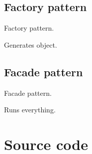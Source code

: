 \documentclass[letterpaper,10pt,english]{sphinxmanual}
\begin{document}
\subsection{Factory pattern}
\label{index:factory-pattern}

\begin{fulllineitems}
\label{index:spy.SiteFactory}
Factory pattern.

\begin{fulllineitems}
\label{index:spy.SiteFactory.get_site}
Generates  object.

\end{fulllineitems}


\end{fulllineitems}



\subsection{Facade pattern}
\label{index:facade-pattern}

\begin{fulllineitems}
\label{index:spy.SPy}
Facade pattern.

\begin{fulllineitems}
\label{index:spy.SPy.run}
Runs everything.

\end{fulllineitems}


\end{fulllineitems}



\section{Source code}
\label{index:source-code}\label{index:module-spy}
\end{document}
